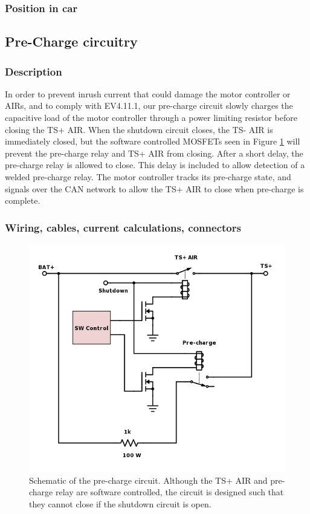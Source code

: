 \documentclass{article}
\begin{document}
\subsubsection{Position in car}

\subsection{Pre-Charge circuitry}\label{pre_charge_circuitry}
\subsubsection{Description}

In order to prevent inrush current that could damage the motor controller or AIRs, and to comply with EV4.11.1, our pre-charge circuit slowly charges the capacitive load of the motor controller through a power limiting resistor before closing the TS+ AIR. When the shutdown circuit closes, the TS- AIR is immediately closed, but the software controlled MOSFETs seen in Figure \ref{precharge_schem} will prevent the pre-charge relay and TS+ AIR from closing. After a short delay, the pre-charge relay is allowed to close. This delay is included to allow detection of a welded pre-charge relay. The motor controller tracks its pre-charge state, and signals over the CAN network to allow the TS+ AIR to close when pre-charge is complete. 

\subsubsection{Wiring, cables, current calculations, connectors}

\begin{figure}[H]
    \centering
    \includegraphics[width = 0.7 \textwidth]{precharge_schem}
    \caption{Schematic of the pre-charge circuit. Although the TS+ AIR and pre-charge relay are software controlled, the circuit is designed such that they cannot close if the shutdown circuit is open.}
    \label{precharge_schem}
\end{figure}
\end{document}
